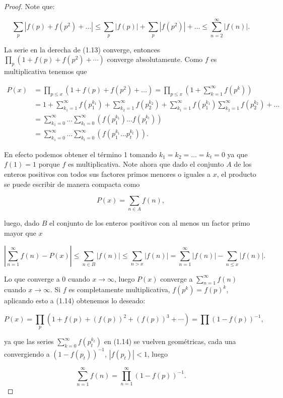 \begin{proof}
Note que:

\begin{equation}
\sum_{p}\left|f(p)+f(p^2)+\ldots\right|\leq \sum_p \left|f(p)\right|+\sum_p \left|f(p^2)\right|+\ldots\leq\sum_{n=2}^{\infty} \left|f(n)\right|.
\end{equation}

La serie en la derecha de (1.13) converge, entonces $\displaystyle\prod_p\left(1+f(p)+f\left(p^2\right)+\cdots\right)$ converge absolutamente. Como $f$ es multiplicativa tenemos que

\begin{equation}
\begin{aligned}
P(x)&=\prod_{p\leq x}\left(1+f(p)+f(p^2)+\ldots\right)=\prod_{p\leq x}\left(1+\sum_{k=1}^{\infty} f(p^k)\right)\\
&=1+\sum_{k_1=1}^{\infty}f(p_1^{k_1})+\sum_{k_2=1}^{\infty}f(p_2^{k_2})+\sum_{k_1=1}^{\infty} f(p_1^{k_1})\sum_{k_2=1}^{\infty} f(p_2^{k_2})+\ldots\\
&=\sum_{k_1=0}^{\infty}\ldots \sum_{k_t=0}^{\infty}(f(p_1^{k_1})\ldots f(p_t^{k_t}))\\
&=\sum_{k_1=0}^{\infty}\ldots \sum_{k_t=0}^{\infty}(f(p_1^{k_1}\ldots p_t^{k_t})).
\end{aligned}
\end{equation}

En efecto podemos obtener el término 1 tomando $k_1=k_2=\ldots=k_t=0$ ya que $f(1)=1$ porque $f$ es multiplicativa. Note ahora que dado el conjunto $A$ de los enteros positivos con todos sus factores primos menores o iguales a $x$, el producto se puede escribir de manera compacta como

$$P(x)=\sum_{n\in A}f(n),$$

luego, dado $B$ el conjunto de los enteros positivos con al menos un factor primo mayor que $x$

$$
\left|\sum_{n=1}^{\infty} f(n)-P(x)\right| \leq \sum_{n \in B}|f(n)| \leq \sum_{n>x}|f(n)|=\sum_{n=1}^{\infty}|f(n)|-\sum_{n \leq x}|f(n)|.
$$

Lo que converge a $0$ cuando $x\to \infty$, luego $P(x)$ converge a $\displaystyle \sum_{n=1}^{\infty} f(n)$ cuando $x\to \infty$. Si $f$ es completamente  multiplicativa, $f(p^k)=f(p)^k$, aplicando esto a (1.14) obtenemos lo deseado:

$$P(x)=\prod_p\left(1+f(p)+(f(p))^2+(f(p))^3+\cdots\right)=\prod(1-f(p))^{-1},$$

ya que las series $\displaystyle\sum_{k=0}^{\infty}f(p_t^{k_t})$ en (1.14) se vuelven geométricas, cada una convergiendo a $(1-f(p_t))^{-1}$, $\left|f(p_t)\right|<1
    $, luego

$$\sum_{n=1}^{\infty} f(n)=\prod_{n=1}^{\infty} (1-f(p))^{-1}.$$
\end{proof}

